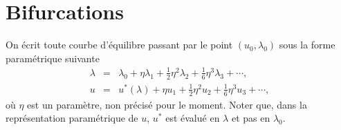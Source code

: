 \documentclass{article}
\begin{document}
\section{Bifurcations}

On écrit toute courbe d'équilibre passant par le point $(u_0,
λ_0)$ sous la forme paramétrique suivante
\begin{eqnarray}
  λ & = & λ_0 + \eta λ_1 + \tfrac{1}{2} \eta^2 λ_2 +
  \tfrac{1}{6} \eta^3 λ_3 + \cdots,  \label{eq20211115075817}\\
  u & = & u^{\ast} (λ) + \eta u_1 + \tfrac{1}{2} \eta^2 u_2 +
  \tfrac{1}{6} \eta^3 u_3 + \cdots,  \label{eq20211115075835}
\end{eqnarray}
où $\eta$ est un paramètre, non précisé pour le moment. Noter
que, dans la représentation paramétrique de $u$, $u^{\ast}$ est
évalué en $λ$ et pas en $λ_0$.
\end{document}
